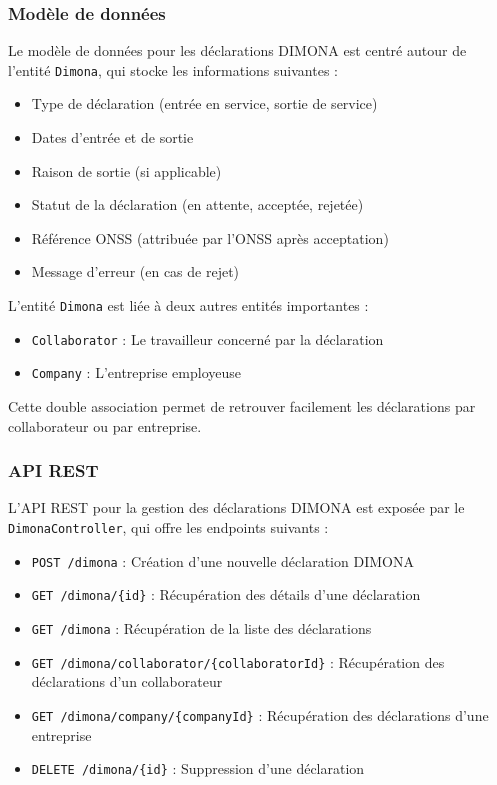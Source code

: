 \documentclass[12pt,a4paper]{report}
\begin{document}
\subsubsection{Modèle de données}

Le modèle de données pour les déclarations DIMONA est centré autour de l'entité \texttt{Dimona}, qui stocke les informations suivantes :

\begin{itemize}
  \item Type de déclaration (entrée en service, sortie de service)
  \item Dates d'entrée et de sortie
  \item Raison de sortie (si applicable)
  \item Statut de la déclaration (en attente, acceptée, rejetée)
  \item Référence ONSS (attribuée par l'ONSS après acceptation)
  \item Message d'erreur (en cas de rejet)
\end{itemize}

L'entité \texttt{Dimona} est liée à deux autres entités importantes :
\begin{itemize}
  \item \texttt{Collaborator} : Le travailleur concerné par la déclaration
  \item \texttt{Company} : L'entreprise employeuse
\end{itemize}

Cette double association permet de retrouver facilement les déclarations par collaborateur ou par entreprise.

\subsubsection{API REST}

L'API REST pour la gestion des déclarations DIMONA est exposée par le \texttt{DimonaController}, qui offre les endpoints suivants :

\begin{itemize}
  \item \texttt{POST /dimona} : Création d'une nouvelle déclaration DIMONA
  \item \texttt{GET /dimona/\{id\}} : Récupération des détails d'une déclaration
  \item \texttt{GET /dimona} : Récupération de la liste des déclarations
  \item \texttt{GET /dimona/collaborator/\{collaboratorId\}} : Récupération des déclarations d'un collaborateur
  \item \texttt{GET /dimona/company/\{companyId\}} : Récupération des déclarations d'une entreprise
  \item \texttt{DELETE /dimona/\{id\}} : Suppression d'une déclaration
\end{itemize}
\end{document}
